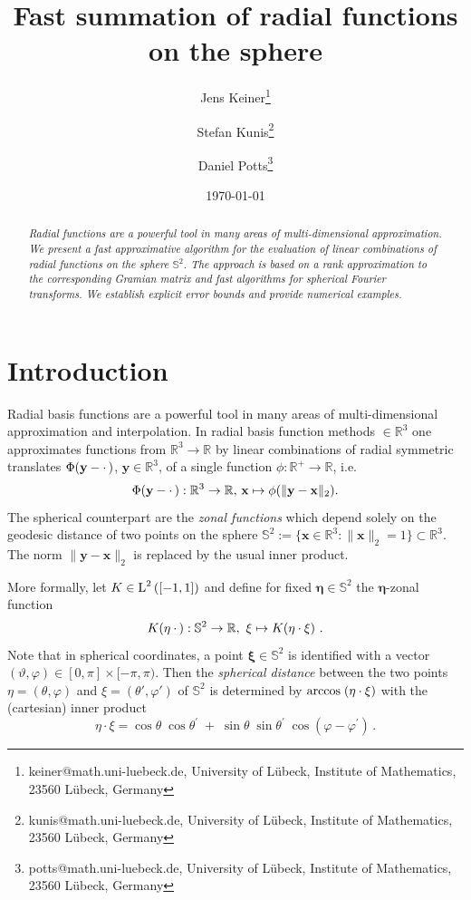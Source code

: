\documentclass[11pt,a4paper,twoside,bibtotoc]{scrartcl}
\title{Fast summation of radial functions on the sphere}
\date{\today}
\author{
Jens Keiner\thanks{keiner@math.uni-luebeck.de, University of
  L\"ubeck, Institute of Mathematics, 23560 L\"ubeck, Germany} \and
Stefan Kunis\thanks{kunis@math.uni-luebeck.de, University of
  L\"ubeck, Institute of Mathematics, 23560 L\"ubeck, Germany} \and
Daniel Potts\thanks{potts@math.uni-luebeck.de, University of
  L\"ubeck, Institute of Mathematics, 23560 L\"ubeck, Germany} 
}
\theoremstyle{plain}
\theoremstyle{definition}
\theoremstyle{remark}
\newcommand{\R}{\ensuremath{\mathbb{R}}}
\newcommand{\Ln}[2]{\ensuremath{\text{\rm{L}}^{#1}\left(#2\right)}}
\newcommand{\fun}[2]{\ensuremath{#1{\hspace{-0.4ex}}\left(#2\right)}}
\numberwithin{equation}{section}
\numberwithin{table}{section}
\numberwithin{figure}{section}
\begin{document}
\maketitle

\begin{abstract}
\medskip
\noindent
{\it Radial functions are a powerful tool in many areas of multi-dimensional 
approximation. We present a fast approximative algorithm for the evaluation of
linear combinations of radial functions on the sphere $\mathbb{S}^2$. The 
approach is based on a rank approximation to the corresponding Gramian matrix
and fast algorithms for spherical Fourier transforms. We establish explicit error 
bounds and provide numerical examples.}
\end{abstract}

\section{Introduction}\label{sect:1}
Radial basis functions are a powerful tool in many areas of multi-dimensional 
approximation and interpolation.
In radial basis function methods $\in \R^3$ one approximates functions
from $\R^3 
\rightarrow \R$ by linear combinations of radial symmetric translates 
$\fun{\Phi}{\mathbf{y} - \cdot \,}$, $\mathbf{y} \in \R^3$, of a single function $\phi : \R^{+} \rightarrow \R$, i.e. 
\[
  \fun{\Phi}{\mathbf{y} - \cdot \,}:\R^3 \rightarrow \R, \, \mathbf{x} \mapsto \phi(\|\mathbf{y} - \mathbf{x}\|_2).
\]
The spherical counterpart are the \emph{zonal functions} which depend solely
on the geodesic distance of two points on the sphere $\mathbb{S}^2:=\{
\mathbf{x} \in \mathbb{R}^3: \|\mathbf{x}\|_2=1\} \subset \R^3$. The norm $\|\mathbf{y} - \mathbf{x}\|_2$ 
is replaced by the usual inner product.

More formally, let $K \in \Ln{2}{[-1,1]}$ and define for fixed
$\mathbf{\eta} \in \mathbb{S}^2$ the $\mathbf{\eta}$-zonal function 
\[
  \fun{K}{\mathbf{\eta} \: \cdot \,}: \mathbb{S}^2 \rightarrow \R,\ \mathbf{\xi} \mapsto
  \fun{K}{\mathbf{\eta} \cdot \mathbf{\xi}}\,.%
\]
Note that in spherical coordinates, a point $\mathbf{\xi} \in \mathbb{S}^2$ is identified with 
a vector $(\vartheta,\varphi) \in [0,\pi] \times [-\pi,\pi)$. 
Then the {\it spherical distance} between the two points 
$\eta=(\theta,\varphi)$ and $\xi=(\theta',\varphi')$ of $\mathbb{S}^2$ is
determined by
$
{\rm arccos}\;  (\eta\cdot \xi)                     
$
with the (cartesian) inner product 
$$
\eta\cdot \xi = \cos\theta\; \cos \theta^\prime \; +\; \sin\theta\; \sin
\theta^\prime\;\cos(\varphi-\varphi^\prime)\, .
$$
\end{document}
